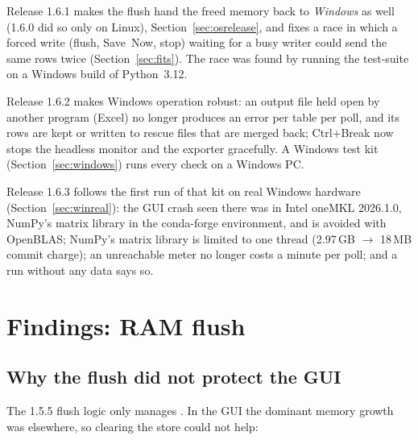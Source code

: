\documentclass[11pt,a4paper]{article}
\newcommand{\code}[1]{\texttt{\detokenize{#1}}}
\begin{document}
Release 1.6.1 makes the flush hand the freed memory back to \emph{Windows}
as well (1.6.0 did so only on Linux), Section~\ref{sec:osrelease}, and fixes a
race in which a forced write (flush, Save~Now, stop) waiting for a busy writer
could send the same rows twice (Section~\ref{sec:fits}). The race was found by
running the test-suite on a Windows build of Python~3.12.

Release 1.6.2 makes Windows operation robust: an output file held open by
another program (Excel) no longer produces an error per table per poll, and
its rows are kept or written to rescue files that are merged back; Ctrl+Break
now stops the headless monitor and the exporter gracefully. A Windows test
kit (Section~\ref{sec:windows}) runs every check on a Windows PC.

Release 1.6.3 follows the first run of that kit on real Windows hardware
(Section~\ref{sec:winreal}): the GUI crash seen there was in Intel oneMKL
2026.1.0, NumPy's matrix library in the conda-forge environment, and is
avoided with OpenBLAS; NumPy's matrix library is limited to one thread
(2.97\,GB $\rightarrow$ 18\,MB commit charge); an unreachable meter no longer
costs a minute per poll; and a run without any data says so.

\section{Findings: RAM flush}\label{sec:ramflush}
\subsection{Why the flush did not protect the GUI}
The 1.5.5 flush logic only manages \code{TIME_SERIES_STORE}. In the GUI the
dominant memory growth was elsewhere, so clearing the store could not help:
\end{document}
